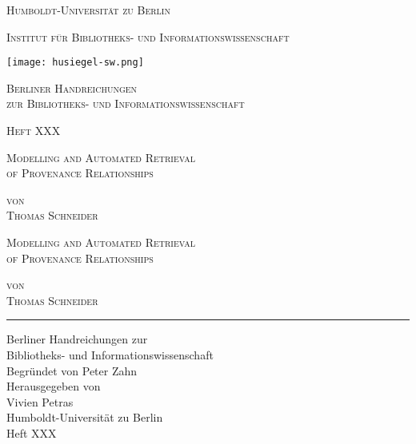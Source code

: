 \documentclass[paper=a4,11pt,twoside,parskip=half-]{scrreprt} %
\begin{document}
\begin{titlepage}
\centering

{\Huge \scshape Humboldt-Universität zu Berlin \par}
{\Large \scshape Institut für Bibliotheks- und Informationswissenschaft \par}

\vspace{2cm}

\texttt{[image: husiegel-sw.png]}\\

\vspace{2cm}

{\huge \scshape Berliner Handreichungen \\zur Bibliotheks- und Informationswissenschaft \par}

\vspace{2cm}

{\LARGE \scshape Heft XXX \par} %

\vspace{2,5cm}

{\Large \scshape Modelling and Automated Retrieval \\ of Provenance Relationships \par}

\vspace{2cm}

{\LARGE \scshape von \\ Thomas Schneider}

\end{titlepage}

\clearpage{\thispagestyle{empty}\cleardoublepage}
\clearpage{\thispagestyle{empty}\cleardoublepage}
\centering
\phantom{x}
\vspace{5cm}

{\Large \scshape Modelling and Automated Retrieval \\ of Provenance Relationships \par}

\vspace{4cm}

{\Large \scshape von \\ Thomas Schneider \par}

\vspace{3cm}
\hrule
\vspace{1cm}
\raggedleft
{\Large Berliner Handreichungen zur \\
Bibliotheks- und Informationswissenschaft \\
\vspace{1cm}
Begründet von Peter Zahn \\
Herausgegeben von \\
Vivien Petras \\
Humboldt-Universität zu Berlin \\
\vspace{.5cm}
Heft XXX} %
\end{document}
